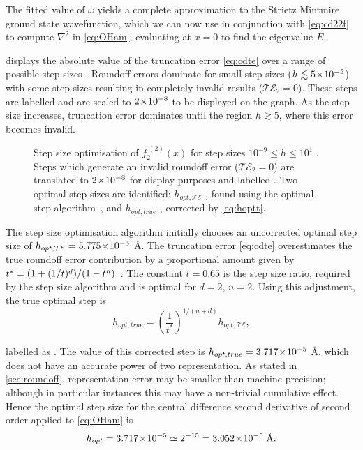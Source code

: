 The fitted value of $\omega$ yields a complete approximation to the Strietz Mintmire ground state wavefunction, which we can now use in conjunction with \cref{eq:cd22f} to compute $\nabla^2$ in \cref{eq:OHam}; evaluating at $x = 0$ to find the eigenvalue $E$.

 displays the absolute value of the truncation error \cref{eq:cdte} over a range of possible step sizes .
Roundoff errors dominate for small step sizes ($h \lesssim 5\!\times\!10^{-5}$) with some step sizes resulting in completely invalid results (\ie $\mathcal{TE}_2 = 0$).
These steps are labelled  and are scaled to $2\!\times\!10^{-8}$ to be displayed on the graph.
As the step size increases, truncation error dominates until the region $h \gtrsim 5$, where this error becomes invalid.
\begin{figure}[htp]
\centering
\resizebox{\textwidth}{!}{}
\caption[Step size optimisation of $f_2^{\;(2)}(x)$]{\label{fig:hopt3pt}Step size optimisation of $f_2^{\;(2)}(x)$ for step sizes $10^{-9}\!\leq\! h\! \leq\! 10^1$ . Steps which generate an invalid roundoff error (\ie $\mathcal{TE}_2 = 0$) are translated to $2\!\times\!10^{-8}$ for display purposes and labelled . Two optimal step sizes are identified: $h_{opt,\mathcal{TE}}$ , found using the optimal step algorithm~\cite{Mathur2012}, and $h_{opt,true}$ , corrected by \cref{eq:hoptt}.}
\end{figure}

The step size optimisation algorithm initially chooses an uncorrected optimal step size  of $h_{opt,\mathcal{TE}} = 5.775\!\times\!10^{-5}$ Å.
The truncation error \cref{eq:cdte} overestimates the true roundoff error contribution by a proportional amount given by $\cramped{t^* = (1+(1/t)^d)/(1-t^n)}$~\cite{Mathur2012}.
The constant $t = 0.65$ is the step size ratio, required by the step size algorithm and is optimal for $d=2$, $n=2$.
Using this adjustment, the true optimal step is
\begin{equation}
h_{opt,true} = \left(\frac{1}{t^*}\right)^{1/(n+d)}h_{opt,\mathcal{TE}},\label{eq:hoptt}
\end{equation}

labelled as .
The value of this corrected step is $h_{opt,true} = 3.717\!\times\!10^{-5}$ Å, which does not have an accurate power of two representation.
As stated in \cref{sec:roundoff}, representation error may be smaller than machine precision; although in particular instances this may have a non-trivial cumulative effect.
Hence the optimal step size for the central difference second derivative of second order applied to \cref{eq:OHam} is
\begin{equation}
h_{opt} = 3.717\!\times\!10^{-5} \simeq 2^{-15} = 3.052\!\times\!10^{-5}\;\text{Å}.
\end{equation}

